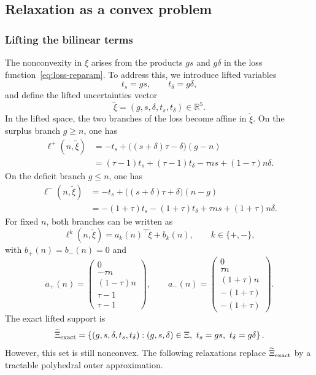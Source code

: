 \documentclass[11pt]{article}
\newcommand{\R}{\mathbb{R}}
\newcommand{\XiSet}{\Xi}
\theoremstyle{plain}
\theoremstyle{definition}
\begin{document}
 \subsection{Relaxation as a convex problem} 
 \label{subsec:convex-relaxations} 
 \subsubsection{Lifting the bilinear terms}
 The nonconvexity in $\xi$ arises from the products $gs$ and $g\delta$ in the loss function~\eqref{eq:loss-reparam}. 
 To address this, we introduce lifted variables \[ t_s=gs, \qquad t_\delta=g\delta, \] and define the lifted uncertainties vector \[ \widetilde\xi=(g,s,\delta,t_s,t_\delta)\in\R^5. \] 
 In the lifted space, the two branches of the loss become affine in $\widetilde\xi$. 
 On the surplus branch $g\ge n$, one has \begin{align} \label{eq:loss-surplus-lifted} \ell^+(n,\widetilde\xi) &= -t_s+\big((s+\delta)\tau-\delta\big)(g-n) \nonumber\\ &= (\tau-1)t_s + (\tau-1)t_\delta - \tau n s + (1-\tau)n\delta . \end{align} 
 On the deficit branch $g\le n$, one has \begin{align} \label{eq:loss-deficit-lifted} \ell^-(n,\widetilde\xi) &= -t_s+\big((s+\delta)\tau+\delta\big)(n-g) \nonumber\\ &= -(1+\tau)t_s - (1+\tau)t_\delta + \tau n s + (1+\tau)n\delta . \end{align} 
 For fixed $n$, both branches can be written as \[ \ell^k(n,\widetilde\xi)=a_k(n)^\top\widetilde\xi+b_k(n), \qquad k\in\{+,-\}, \] with $b_+(n)=b_-(n)=0$ and \[ a_+(n) = \begin{pmatrix} 0\\ -\tau n\\ (1-\tau)n\\ \tau-1\\ \tau-1 \end{pmatrix}, \qquad a_-(n) = \begin{pmatrix} 0\\ \tau n\\ (1+\tau)n\\ -(1+\tau)\\ -(1+\tau) \end{pmatrix}. \] 
 The exact lifted support is \[ \widetilde\Xi_{\rm exact} = \left\{ (g,s,\delta,t_s,t_\delta): (g,s,\delta)\in\XiSet,\ t_s=gs,\ t_\delta=g\delta \right\}. \] 
 However, this set is still nonconvex. 
 The following relaxations replace $\widetilde\Xi_{\rm exact}$ by a tractable polyhedral outer approximation. 
 
\end{document}
